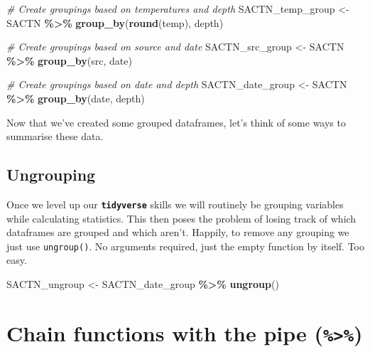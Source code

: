 \documentclass[
]{book}
\newenvironment{Shaded}{\begin{snugshade}}{\end{snugshade}}
\newcommand{\CommentTok}[1]{\textcolor[rgb]{0.56,0.35,0.01}{\textit{#1}}}
\newcommand{\KeywordTok}[1]{\textcolor[rgb]{0.13,0.29,0.53}{\textbf{#1}}}
\newcommand{\NormalTok}[1]{#1}
\newcommand{\OperatorTok}[1]{\textcolor[rgb]{0.81,0.36,0.00}{\textbf{#1}}}
\newcommand{\StringTok}[1]{\textcolor[rgb]{0.31,0.60,0.02}{#1}}
\begin{document}
\begin{Shaded}
\begin{Highlighting}[]
\CommentTok{\# Create groupings based on temperatures and depth}
\NormalTok{SACTN\_temp\_group <{-}}\StringTok{ }\NormalTok{SACTN }\OperatorTok{\%>\%}\StringTok{ }
\StringTok{  }\KeywordTok{group\_by}\NormalTok{(}\KeywordTok{round}\NormalTok{(temp), depth)}

\CommentTok{\# Create groupings based on source and date}
\NormalTok{SACTN\_src\_group <{-}}\StringTok{ }\NormalTok{SACTN }\OperatorTok{\%>\%}\StringTok{ }
\StringTok{  }\KeywordTok{group\_by}\NormalTok{(src, date)}

\CommentTok{\# Create groupings based on date and depth}
\NormalTok{SACTN\_date\_group <{-}}\StringTok{ }\NormalTok{SACTN }\OperatorTok{\%>\%}\StringTok{ }
\StringTok{  }\KeywordTok{group\_by}\NormalTok{(date, depth)}
\end{Highlighting}
\end{Shaded}

Now that we've created some grouped dataframes, let's think of some ways to summarise these data.

\hypertarget{ungrouping}{%
\subsection{Ungrouping}\label{ungrouping}}

Once we level up our \textbf{\texttt{tidyverse}} skills we will routinely be grouping variables while calculating statistics. This then poses the problem of losing track of which dataframes are grouped and which aren't. Happily, to remove any grouping we just use \texttt{ungroup()}. No arguments required, just the empty function by itself. Too easy.

\begin{Shaded}
\begin{Highlighting}[]
\NormalTok{SACTN\_ungroup <{-}}\StringTok{ }\NormalTok{SACTN\_date\_group }\OperatorTok{\%>\%}\StringTok{ }
\StringTok{  }\KeywordTok{ungroup}\NormalTok{()}
\end{Highlighting}
\end{Shaded}

\hypertarget{chain-functions-with-the-pipe}{%
\section{\texorpdfstring{Chain functions with the pipe (\texttt{\%\textgreater{}\%})}{Chain functions with the pipe (\%\textgreater\%)}}\label{chain-functions-with-the-pipe}}
\end{document}
